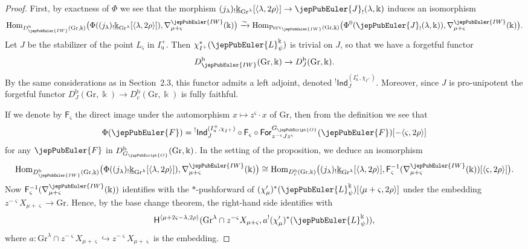 \begin{proof}
First, by exactness of $\Phi$ we see that the morphism $(j_\lambda)_!\underline{\Bbbk}_{\mathrm{Gr}^\lambda}[\langle\lambda,2\rho\rangle]\to\jepPubEuler{J}_!(\lambda,\Bbbk)$ induces an isomorphism
\[
\operatorname{Hom}_{D^{\mathrm{b}}_{\jepPubEuler{IW}}(\mathrm{Gr},\Bbbk)}\bigl(\Phi((j_\lambda)_!\underline{\Bbbk}_{\mathrm{Gr}^\lambda}[\langle\lambda,2\rho\rangle]),\nabla^{\jepPubEuler{IW}}_{\mu+\varsigma}(\Bbbk)\bigr)
\xrightarrow{\sim}\operatorname{Hom}_{\mathrm{Perv}_{\jepPubEuler{IW}}(\mathrm{Gr},\Bbbk)}\bigl(\Phi^0(\jepPubEuler{J}_!(\lambda,\Bbbk)),\nabla^{\jepPubEuler{IW}}_{\mu+\varsigma}(\Bbbk)\bigr).
\]
Let $J$ be the stabilizer of the point $L_\varsigma$ in $I^+_\mathrm{u}$. Then $\chi_{I^+}^*(\jepPubEuler{L}^\Bbbk_\psi)$ is trivial on $J$, so that we have a forgetful functor
\[
D^{\mathrm{b}}_{\jepPubEuler{IW}}(\mathrm{Gr},\Bbbk)\to D^{\mathrm{b}}_J(\mathrm{Gr},\Bbbk).
\]
By the same considerations as in Section~2.3, this functor admits a left adjoint, denoted ${}^{!}\mathsf{Ind}_J^{(I^+_\mathrm{u},\chi_{I^+})}$. Moreover, since $J$ is pro-unipotent the forgetful functor $D^{\mathrm{b}}_J(\mathrm{Gr},\Bbbk)\to D^{\mathrm{b}}_c(\mathrm{Gr},\Bbbk)$ is fully faithful.

If we denote by $\mathsf{F}_\varsigma$ the direct image under the automorphism $x\mapsto z^\varsigma\cdot x$ of $\mathrm{Gr}$, then from the definition we see that
\begin{equation}\label{jep104local005}
\Phi(\jepPubEuler{F})={}^{!}\mathsf{Ind}_J^{(I^+_\mathrm{u},\chi_{I^+})}\circ\mathsf{F}_\varsigma\circ\mathsf{For}_{z^{-\varsigma}Jz^\varsigma}^{G_{\jepPubScript{O}}}(\jepPubEuler{F})[-\langle\varsigma,2\rho\rangle]
\end{equation}
for any $\jepPubEuler{F}$ in $D^{\mathrm{b}}_{G_{\jepPubScript{O}}}(\mathrm{Gr},\Bbbk)$. In the setting of the proposition, we deduce an isomorphism
\[
\operatorname{Hom}_{D^{\mathrm{b}}_{\jepPubEuler{IW}}(\mathrm{Gr},\Bbbk)}\bigl(\Phi((j_\lambda)_!\underline{\Bbbk}_{\mathrm{Gr}^\lambda}[\langle\lambda,2\rho\rangle]),\nabla^{\jepPubEuler{IW}}_{\mu+\varsigma}(\Bbbk)\bigr)
\cong\operatorname{Hom}_{D^{\mathrm{b}}_c(\mathrm{Gr},\Bbbk)}\bigl((j_\lambda)_!\underline{\Bbbk}_{\mathrm{Gr}^\lambda}[\langle\lambda,2\rho\rangle],\mathsf{F}_\varsigma^{-1}(\nabla^{\jepPubEuler{IW}}_{\mu+\varsigma}(\Bbbk))[\langle\varsigma,2\rho\rangle]\bigr).
\]
Now $\mathsf{F}_\varsigma^{-1}(\nabla^{\jepPubEuler{IW}}_{\mu+\varsigma}(\Bbbk))$ identifies with the $*$-pushforward of $(\chi'_\mu)^*(\jepPubEuler{L}^\Bbbk_\psi)[\langle\mu+\varsigma,2\rho\rangle]$ under the embedding $z^{-\varsigma}X_{\mu+\varsigma}\to\mathrm{Gr}$. Hence, by the base change theorem, the right-hand side identifies with
\[
\mathsf{H}^{\langle\mu+2\varsigma-\lambda,2\rho\rangle}(\mathrm{Gr}^\lambda\cap z^{-\varsigma}X_{\mu+\varsigma},a^!(\chi'_\mu)^*(\jepPubEuler{L}^\Bbbk_\psi)),
\]
where $a:\mathrm{Gr}^\lambda\cap z^{-\varsigma}X_{\mu+\varsigma}\hookrightarrow z^{-\varsigma}X_{\mu+\varsigma}$ is the embedding.


\end{proof}
